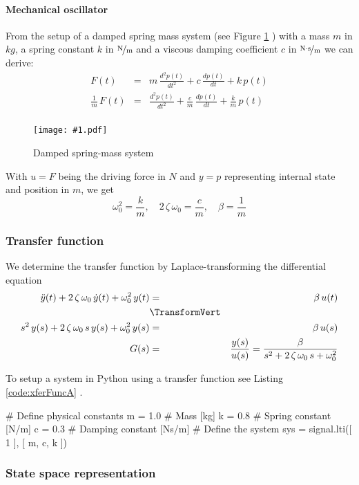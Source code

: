 \documentclass[a4paper,12pt]{article}
\newcommand{\Fig}[3]{%
	\begin{figure}[htb]%
	\begin{center}%
	\texttt{[image: \#1.pdf]}%
	\end{center}%
	\caption{#3\label{fig:#1}}%
	\end{figure}%
	}
\newcommand{\FigRef}[1]{%
	Figure \ref{fig:#1}%
	}
\newcommand*{\CodeLabel}{}
\newcommand*{\CodeCaption}{}
\newenvironment{code}[3]%
	{\renewcommand*{\CodeLabel}{#2}\renewcommand*{\CodeCaption}{#3}\codefloat\hrulefill\minted{#1}}
	{\endminted\caption{\CodeCaption\label{code:\CodeLabel}}\hrulefill\endcodefloat}
\newcommand{\CodeRef}[1]{%
	Listing \ref{code:#1}%
	}
\newcommand{\pfrac}[2]{\frac{#1}{#2}}
\newcommand{\SubSubSection}[2]{\subsubsection{#2}\label{subsubsection:#1}}
\begin{document}
\paragraph{Mechanical oscillator}

From the setup of a damped spring mass system (see \FigRef{mechoscil}) with a
mass $m$ in $\unit{kg}$, a spring constant $k$ in $\unitfrac{N}{m}$ and a
viscous damping coefficient $c$ in $\unitfrac{N\cdot s}{m}$ we can derive:
\begin{eqnarray}
F(t)&=&m\,\frac{d^2p(t)}{dt^2}+c\,\frac{dp(t)}{dt}+k\,p(t)\\
\frac{1}{m}\,F(t)&=&\frac{d^2p(t)}{dt^2}+\frac{c}{m}\,\frac{dp(t)}{dt}+\frac{k}{m}\,p(t)\\
\end{eqnarray}

\Fig{mechoscil}{0.5}{Damped spring-mass system}

With $u=F$ being the driving force in $\unit{N}$ and $y=p$ representing
internal state and position in $\unit{m}$, we get
\begin{equation}
\omega_0^2=\pfrac{k}{m},\quad2\,\zeta\,\omega_0=\pfrac{c}{m},\quad\beta=\pfrac{1}{m}
\end{equation}


\SubSubSection{xferfuncA}{Transfer function}

We determine the transfer function by Laplace-transforming the differential equation
\begin{eqnarray}
\ddot{y}(t)+2\,\zeta\,\omega_0\,\dot{y}(t)+\omega_0^2\,y(t)&=&\beta\,u(t)\\
&\TransformVert&\nonumber\\
s^2\,y(s)+2\,\zeta\,\omega_0\,s\,y(s)+\omega_0^2\,y(s)&=&\beta\,u(s)\\
G(s)&=&\frac{y(s)}{u(s)}=\frac{\beta}{s^2+2\,\zeta\,\omega_0\,s+\omega_0^2}
\end{eqnarray}

To setup a system in Python using a transfer function see \CodeRef{xferFuncA}.

\begin{code}{python}{xferFuncA}{Initialize system using transfer function}
# Define physical constants
m = 1.0 # Mass [kg]
k = 0.8 # Spring constant [N/m]
c = 0.3 # Damping constant [Ns/m]
# Define the system
sys = signal.lti([ 1 ], [ m, c, k ])
\end{code}

\SubSubSection{sspaceA}{State space representation}
\end{document}
